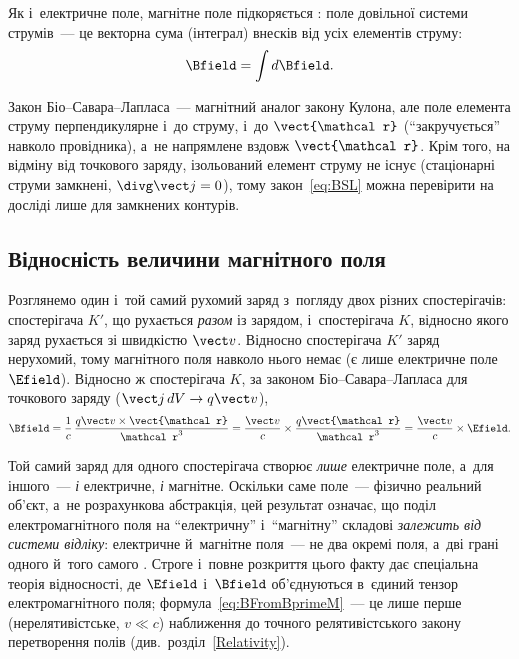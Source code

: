 Як і~електричне поле, магнітне поле підкоряється : поле
довільної системи струмів~--- це векторна сума (інтеграл) внесків від усіх елементів
струму:
\begin{equation}\label{eq:Superposition}
	\Bfield = \int d\Bfield.
\end{equation}

\begin{Attention}[unbreakable]
	Закон Біо--Савара--Лапласа~--- магнітний аналог закону Кулона, але поле елемента
	струму перпендикулярне і~до струму, і~до $\vect{\mathcal r}$ (\enquote{закручується}
	навколо провідника), а~не напрямлене вздовж $\vect{\mathcal r}$. Крім того, на відміну
	від точкового заряду, ізольований елемент струму не існує (стаціонарні струми замкнені,
	$\divg\vect j = 0$), тому закон~\eqref{eq:BSL} можна перевірити на досліді лише для
	замкнених контурів.
\end{Attention}


\subsection*{Відносність величини магнітного поля}


Розглянемо один і~той самий рухомий заряд з~погляду двох різних спостерігачів:
спостерігача $K'$, що рухається \emph{разом} із зарядом, і~спостерігача $K$, відносно
якого заряд рухається зі швидкістю $\vect v$. Відносно спостерігача $K'$ заряд нерухомий,
тому магнітного поля навколо нього немає (є лише електричне поле $\Efield$). Відносно ж
спостерігача $K$, за законом Біо--Савара--Лапласа для точкового заряду ($\vect j\, dV \to
	q\vect v$),
\begin{equation}\label{eq:BFromBprimeM}
	\Bfield = \frac1c\, \frac{q\vect v\times\vect{\mathcal r}}{\mathcal r^3} = \frac{\vect v}{c}\times \frac{q\vect{\mathcal r}}{\mathcal r^3} =
	\frac{\vect v}{c}\times\Efield.
\end{equation}

\begin{Attention}[unbreakable]
	Той самий заряд для одного спостерігача створює \emph{лише} електричне поле, а~для
	іншого~--- \emph{і} електричне, \emph{і} магнітне. Оскільки саме поле~--- фізично
	реальний об'єкт, а~не розрахункова абстракція, цей результат означає, що поділ
	електромагнітного поля на \enquote{електричну} і~\enquote{магнітну} складові
	\emph{залежить від системи відліку}: електричне й~магнітне поля~--- не два окремі
	поля, а~дві грані одного й~того самого . Строге і~повне
	розкриття цього факту дає спеціальна теорія відносності, де $\Efield$ і~$\Bfield$
	об'єднуються в~єдиний тензор електромагнітного поля;
	формула~\eqref{eq:BFromBprimeM}~--- це лише перше (нерелятивістське, $v\ll c$)
	наближення до точного релятивістського закону перетворення полів (див.~розділ~\ref{Relativity}).
\end{Attention}

